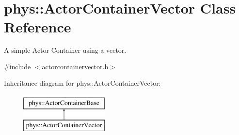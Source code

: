 \hypertarget{classphys_1_1ActorContainerVector}{
\section{phys::ActorContainerVector Class Reference}
\label{d3/d64/classphys_1_1ActorContainerVector}
}


A simple Actor Container using a vector.  




{\ttfamily \#include $<$actorcontainervector.h$>$}

Inheritance diagram for phys::ActorContainerVector:\begin{figure}[H]
\begin{center}
\leavevmode
\includegraphics[height=2cm]{d3/d64/classphys_1_1ActorContainerVector}
\end{center}
\end{figure}
